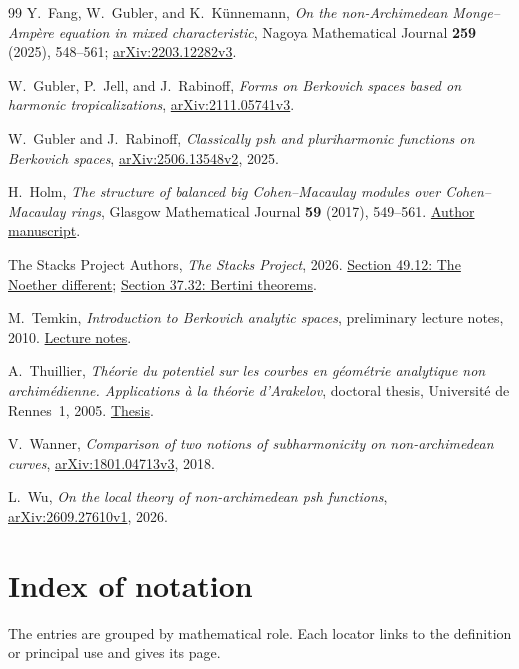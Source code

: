 \documentclass[11pt,reqno]{amsart}
\theoremstyle{definition}
\theoremstyle{remark}
\numberwithin{equation}{section}
\begin{document}
\begin{thebibliography}{99}
Y.~Fang, W.~Gubler, and K.~K\"unnemann,
\emph{On the non-Archimedean Monge--Amp\`ere equation in mixed characteristic},
Nagoya Mathematical Journal \textbf{259} (2025), 548--561;
\href{https://arxiv.org/abs/2203.12282v3}{arXiv:2203.12282v3}.

W.~Gubler, P.~Jell, and J.~Rabinoff,
\emph{Forms on Berkovich spaces based on harmonic tropicalizations},
\href{https://arxiv.org/abs/2111.05741v3}{arXiv:2111.05741v3}.

W.~Gubler and J.~Rabinoff,
\emph{Classically psh and pluriharmonic functions on Berkovich spaces},
\href{https://arxiv.org/abs/2506.13548v2}{arXiv:2506.13548v2}, 2025.

H.~Holm,
\emph{The structure of balanced big Cohen--Macaulay modules over
Cohen--Macaulay rings},
Glasgow Mathematical Journal \textbf{59} (2017), 549--561.
\href{https://web.math.ku.dk/~holm/download/MCM-big.pdf}{Author manuscript}.

The Stacks Project Authors,
\emph{The Stacks Project}, 2026.
\href{https://stacks.math.columbia.edu/tag/0BWB}{Section 49.12:
The Noether different};
\href{https://stacks.math.columbia.edu/tag/0G4C}{Section 37.32:
Bertini theorems}.

M.~Temkin,
\emph{Introduction to Berkovich analytic spaces},
preliminary lecture notes, 2010.
\href{https://berkovich-2010.imj-prg.fr/lecture-notes/Temkin-lecture-notes.pdf}{Lecture notes}.

A.~Thuillier,
\emph{Th\'eorie du potentiel sur les courbes en g\'eom\'etrie
analytique non archim\'edienne. Applications \`a la th\'eorie d'Arakelov},
doctoral thesis, Universit\'e de Rennes~1, 2005.
\href{https://theses.hal.science/tel-00010990/document}{Thesis}.

V.~Wanner,
\emph{Comparison of two notions of subharmonicity on non-archimedean curves},
\href{https://arxiv.org/abs/1801.04713v3}{arXiv:1801.04713v3}, 2018.

L.~Wu,
\emph{On the local theory of non-archimedean psh functions},
\href{https://arxiv.org/abs/2609.27610v1}{arXiv:2609.27610v1}, 2026.

\end{thebibliography}

\clearpage
\section*{Index of notation}\label{sec:notation}
The entries are grouped by mathematical role. Each locator links
to the definition or principal use and gives its page.
\end{document}

